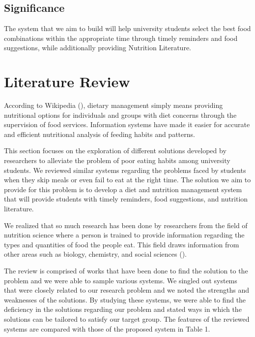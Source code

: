 \documentclass{article}
\begin{document}
\subsection{Significance}

The system that we aim to build will help university students select the best food combinations within the appropriate time through timely reminders and food suggestions, while additionally providing Nutrition Literature.


\newpage
\section{Literature Review}

According to Wikipedia (\citeyear{wikipedia2019dietary}), dietary management simply means providing nutritional options for individuals and groups with diet concerns through the supervision of food services. Information systems have made it easier for accurate and efficient nutritional analysis of feeding habits and patterns.

This section focuses on the exploration of different solutions developed by researchers to alleviate the problem of poor eating habits among university students. We reviewed similar systems regarding the problems faced by students when they skip meals or even fail to eat at the right time. The solution we aim to provide for this problem is to develop a diet and nutrition management system that will provide students with timely reminders, food suggestions, and nutrition literature.

We realized that so much research has been done by researchers from the field of nutrition science where a person is trained to provide information regarding the types and quantities of food the people eat. This field draws information from other areas such as biology, chemistry, and social sciences (\cite{sriram2020hire}).

The review is comprised of works that have been done to find the solution to the problem and we were able to sample various systems. We singled out systems that were closely related to our research problem and we noted the strengths and weaknesses of the solutions. By studying these systems, we were able to find the deficiency in the solutions regarding our problem and stated ways in which the solutions can be tailored to satisfy our target group. The features of the reviewed systems are compared with those of the proposed system in Table 1.
\end{document}
